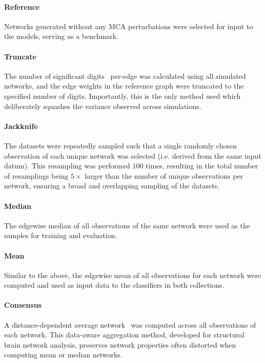 \documentclass[10pt]{SelfArx} %
\begin{document}
\paragraph{Reference} Networks generated without any MCA perturbations were selected for input to the models, serving
as a benchmark.

\paragraph{Truncate} The number of significant digits~\cite{Parker1997-qq} per-edge was calculated using all
simulated networks, and the edge weights in the reference graph were truncated to the specified number of digits.
Importantly, this is the only method used which deliberately squashes the variance observed across simulations.

\paragraph{Jackknife} The datasets were repeatedly sampled such that a single randomly chosen observation of each
unique network was selected (i.e. derived from the same input datum). This resampling was performed $100$ times,
resulting in the total number of resamplings being $5\times$ larger than the number of unique observations per network,
ensuring a broad and overlapping sampling of the datasets.

\paragraph{Median} The edgewise median of all observations of the same network were used as the samples for training
and evaluation.

\paragraph{Mean} Similar to the above, the edgewise mean of all observations for each network were computed and used
as input data to the classifiers in both collections.

\paragraph{Consensus} A distance-dependent average network~\cite{Betzel2018-eo} was computed across all observations
of each network. This data-aware aggregation method, developed for structural brain network analysis, preserves network
properties often distorted when computing mean or median networks.
\end{document}
